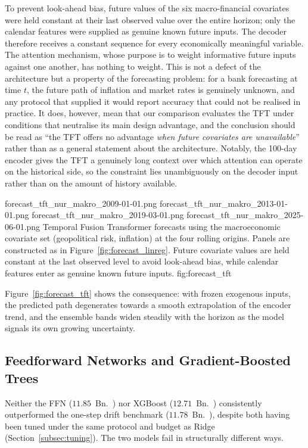 \documentclass[11pt,a4paper]{article}
\begin{document}
To prevent look-ahead bias, future values of the six macro-financial
covariates were held constant at their last observed value over the entire
horizon; only the calendar features were supplied as genuine known future
inputs. The decoder therefore receives a constant sequence for every
economically meaningful variable. The attention mechanism, whose purpose is to
weight informative future inputs against one another, has nothing to weight.
This is not a defect of the architecture but a property of the forecasting
problem: for a bank forecasting at time $t$, the future path of inflation and
market rates is genuinely unknown, and any protocol that supplied it would
report accuracy that could not be realised in practice. It does, however, mean
that our comparison evaluates the TFT under conditions that neutralise its
main design advantage, and the conclusion should be read as ``the TFT offers
no advantage \emph{when future covariates are unavailable}'' rather than as a
general statement about the architecture. Notably, the 100-day encoder gives
the TFT a genuinely long context over which attention can operate on the
historical side, so the constraint lies unambiguously on the decoder input
rather than on the amount of history available.

\originsgrid
  {forecast_tft_nur_makro_2009-01-01.png}
  {forecast_tft_nur_makro_2013-01-01.png}
  {forecast_tft_nur_makro_2019-03-01.png}
  {forecast_tft_nur_makro_2025-06-01.png}
  {Temporal Fusion Transformer forecasts using the macroeconomic covariate set
   (geopolitical risk, inflation) at the four rolling origins. Panels are
   constructed as in Figure~\ref{fig:forecast_linreg}. Future covariate values
   are held constant at the last observed level to avoid look-ahead bias,
   while calendar features enter as genuine known future inputs.}
  {fig:forecast_tft}

Figure~\ref{fig:forecast_tft} shows the consequence: with frozen exogenous
inputs, the predicted path degenerates towards a smooth extrapolation of the
encoder trend, and the ensemble bands widen steadily with the horizon as the
model signals its own growing uncertainty.

\subsection{Feedforward Networks and Gradient-Boosted Trees}
Neither the FFN ($11.85$~Bn.~\texteuro) nor XGBoost ($12.71$~Bn.~\texteuro)
consistently outperformed the one-step drift benchmark
($11.78$~Bn.~\texteuro), despite both having been tuned under the same
protocol and budget as Ridge (Section~\ref{subsec:tuning}). The two models
fail in structurally different ways.
\end{document}
